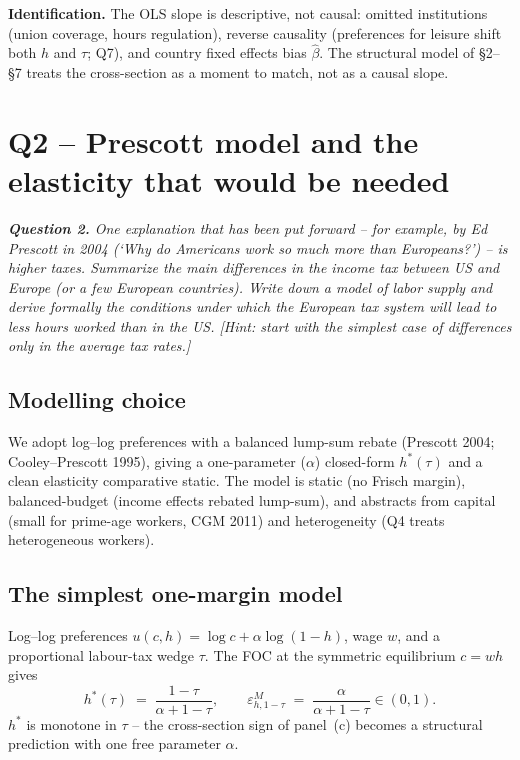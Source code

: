 \documentclass[9pt,a4paper]{extarticle}
\begin{document}
\textbf{Identification.} The OLS slope is descriptive, not causal:
omitted institutions (union coverage, hours regulation), reverse
causality (preferences for leisure shift both $h$ and $\tau$; Q7), and
country fixed effects bias $\hat\beta$. The structural model of
\S2--\S7 treats the cross-section as a moment to match, not as a
causal slope.

\section{Q2 -- Prescott model and the elasticity that would be needed}

\begingroup\small\itshape\noindent\textbf{Question 2.} One
explanation that has been put forward -- for example, by Ed
Prescott in 2004 (`Why do Americans work so much more than
Europeans?') -- is higher taxes. Summarize the main differences in
the income tax between US and Europe (or a few European countries).
Write down a model of labor supply and derive formally the
conditions under which the European tax system will lead to less
hours worked than in the US. [Hint: start with the simplest case
of differences only in the average tax rates.]\endgroup

\subsection{Modelling choice}
We adopt log--log preferences with a balanced lump-sum rebate
(Prescott 2004; Cooley--Prescott 1995), giving a one-parameter
($\alpha$) closed-form $h^*(\tau)$ and a clean elasticity
comparative static. The model is static (no Frisch margin),
balanced-budget (income effects rebated lump-sum), and abstracts
from capital (small for prime-age workers, CGM 2011) and
heterogeneity (Q4 treats heterogeneous workers).

\subsection{The simplest one-margin model}
Log--log preferences $u(c,h)=\log c+\alpha\log(1-h)$, wage $w$, and a
proportional labour-tax wedge $\tau$. The FOC at the symmetric
equilibrium $c=wh$ gives
\begin{equation}
\boxed{\;h^\ast(\tau)\;=\;\frac{1-\tau}{\alpha+1-\tau},
\qquad
\varepsilon^M_{h,1-\tau}\;=\;\frac{\alpha}{\alpha+1-\tau}\in(0,1).\;}
\label{eq:prescott}
\end{equation}
$h^\ast$ is monotone in $\tau$ -- the cross-section sign of panel~(c)
becomes a structural prediction with one free parameter $\alpha$.
\end{document}
